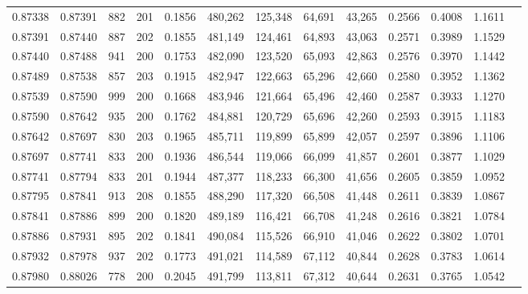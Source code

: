 \begin{tabular}{rrrrrrrrrrrrr}
0.87338 & 0.87391 &   882 & 201 &                                     0.1856 & 480,262 & 125,348 &  64,691 &  43,265 & 0.2566 & 0.4008 & 1.1611 \\
0.87391 & 0.87440 &   887 & 202 &                                     0.1855 & 481,149 & 124,461 &  64,893 &  43,063 & 0.2571 & 0.3989 & 1.1529 \\
0.87440 & 0.87488 &   941 & 200 &                                     0.1753 & 482,090 & 123,520 &  65,093 &  42,863 & 0.2576 & 0.3970 & 1.1442 \\
0.87489 & 0.87538 &   857 & 203 &                                     0.1915 & 482,947 & 122,663 &  65,296 &  42,660 & 0.2580 & 0.3952 & 1.1362 \\
0.87539 & 0.87590 &   999 & 200 &                                     0.1668 & 483,946 & 121,664 &  65,496 &  42,460 & 0.2587 & 0.3933 & 1.1270 \\
0.87590 & 0.87642 &   935 & 200 &                                     0.1762 & 484,881 & 120,729 &  65,696 &  42,260 & 0.2593 & 0.3915 & 1.1183 \\
0.87642 & 0.87697 &   830 & 203 &                                     0.1965 & 485,711 & 119,899 &  65,899 &  42,057 & 0.2597 & 0.3896 & 1.1106 \\
0.87697 & 0.87741 &   833 & 200 &                                     0.1936 & 486,544 & 119,066 &  66,099 &  41,857 & 0.2601 & 0.3877 & 1.1029 \\
0.87741 & 0.87794 &   833 & 201 &                                     0.1944 & 487,377 & 118,233 &  66,300 &  41,656 & 0.2605 & 0.3859 & 1.0952 \\
0.87795 & 0.87841 &   913 & 208 &                                     0.1855 & 488,290 & 117,320 &  66,508 &  41,448 & 0.2611 & 0.3839 & 1.0867 \\
0.87841 & 0.87886 &   899 & 200 &                                     0.1820 & 489,189 & 116,421 &  66,708 &  41,248 & 0.2616 & 0.3821 & 1.0784 \\
0.87886 & 0.87931 &   895 & 202 &                                     0.1841 & 490,084 & 115,526 &  66,910 &  41,046 & 0.2622 & 0.3802 & 1.0701 \\
0.87932 & 0.87978 &   937 & 202 &                                     0.1773 & 491,021 & 114,589 &  67,112 &  40,844 & 0.2628 & 0.3783 & 1.0614 \\
0.87980 & 0.88026 &   778 & 200 &                                     0.2045 & 491,799 & 113,811 &  67,312 &  40,644 & 0.2631 & 0.3765 & 1.0542 \\

\end{tabular}
